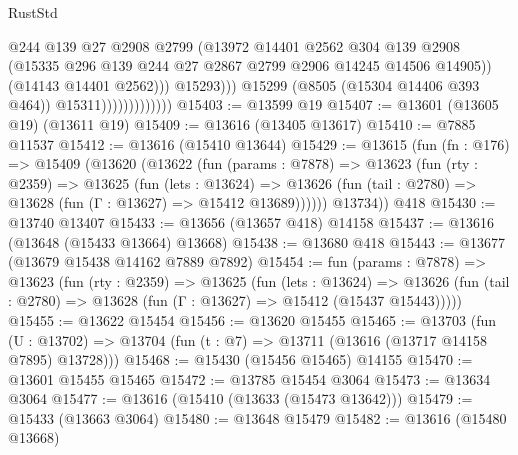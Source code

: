 \begin{lexlean}{RustStd}
\begin{coremodule}
                                        @244
                                        @139
                                        @27
                                        @2908
                                        @2799
                                        (@13972
                                          @14401
                                          @2562
                                          @304
                                          @139
                                          @2908
                                          (@15335
                                            @296
                                            @139
                                            @244
                                            @27
                                            @2867
                                            @2799
                                            @2906
                                            @14245
                                            @14506
                                            @14905))
                                        (@14143 @14401 @2562)))
                                    @15293)))
                              @15299
                              (@8505 (@15304 @14406 @393 @464))
                              @15311)))))))))))))
@15403 := @13599 @19
@15407 := @13601 (@13605 @19) (@13611 @19)
@15409 := @13616 (@13405 @13617)
@15410 := @7885 @11537
@15412 := @13616 (@15410 @13644)
@15429 := @13615
    (fun (fn : @176) =>
    @15409
      (@13620
        (@13622
          (fun (params : @7878) =>
          @13623
            (fun (rty : @2359) =>
            @13625
              (fun (lets : @13624) =>
              @13626 (fun (tail : @2780) => @13628 (fun (Γ : @13627) => @15412 @13689))))))
        @13734))
    @418
@15430 := @13740 @13407
@15433 := @13656 (@13657 @418) @14158
@15437 := @13616 (@13648 (@15433 @13664) @13668)
@15438 := @13680 @418
@15443 := @13677 (@13679 @15438 @14162 @7889 @7892)
@15454 := fun (params : @7878) =>
  @13623
    (fun (rty : @2359) =>
    @13625
      (fun (lets : @13624) =>
      @13626 (fun (tail : @2780) => @13628 (fun (Γ : @13627) => @15412 (@15437 @15443)))))
@15455 := @13622 @15454
@15456 := @13620 @15455
@15465 := @13703
    (fun (U : @13702) => @13704 (fun (t : @7) => @13711 (@13616 (@13717 @14158 @7895) @13728)))
@15468 := @15430 (@15456 @15465) @14155
@15470 := @13601 @15455 @15465
@15472 := @13785 @15454 @3064
@15473 := @13634 @3064
@15477 := @13616 (@15410 (@13633 (@15473 @13642)))
@15479 := @15433 (@13663 @3064)
@15480 := @13648 @15479
@15482 := @13616 (@15480 @13668)

\end{coremodule}
\end{lexlean}

